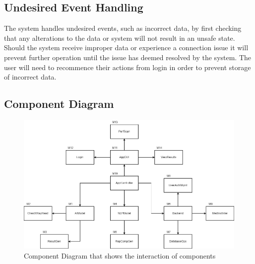 \documentclass[12pt, titlepage]{article}
\begin{document}
\subsection{Undesired Event Handling}
The system handles undesired events, such as incorrect data, by first checking that any alterations to the data or system will not result in an unsafe state. Should the system receive improper data or experience a connection issue it will prevent further operation until the issue has deemed resolved by the system. The user will need to recommence their actions from login in order to prevent storage of incorrect data. 

\subsection{Component Diagram}
\begin{figure}[H]
    \centering
    \includegraphics[scale=0.55]{UsesHierarchy.png}
    \caption{Component Diagram that shows the interaction of components}
    \label{fig:componentDiagram}
\end{figure}
\end{document}
